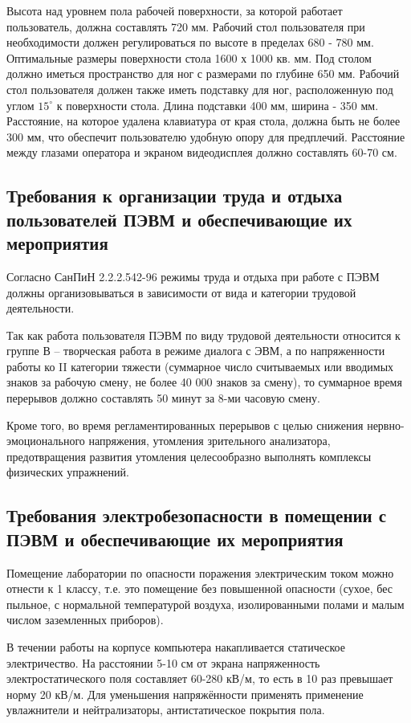 Высота над уровнем пола рабочей  поверхности, за которой работает пользователь, должна составлять 720 мм. Рабочий стол пользователя при необходимости должен регулироваться по высоте в пределах 680 - 780 мм. Оптимальные  размеры  поверхности  стола 1600 х 1000 кв. мм. Под столом должно иметься пространство для ног с размерами по глубине 650 мм. Рабочий стол пользователя должен также иметь подставку для ног, расположенную под углом $15^\circ$ к поверхности стола. Длина подставки 400 мм, ширина - 350 мм. Расстояние, на которое удалена клавиатура от края стола, должна быть не более 300 мм, что обеспечит пользователю удобную опору для предплечий. Расстояние между глазами оператора и экраном видеодисплея должно составлять 60-70 см.

\subsection{Требования к организации труда и отдыха пользователей ПЭВМ и обеспечивающие их мероприятия}
Согласно СанПиН 2.2.2.542-96 режимы труда и отдыха при работе с ПЭВМ должны организовываться в зависимости от вида и категории трудовой деятельности.

Так как работа пользователя ПЭВМ по виду трудовой деятельности относится к группе В – творческая работа в режиме диалога с ЭВМ, а по напряженности работы ко II категории тяжести (суммарное число считываемых или вводимых знаков за рабочую смену, не более 40 000 знаков за смену), то суммарное время перерывов должно составлять 50 минут за 8-ми часовую смену.

Кроме того, во время регламентированных перерывов с целью снижения нервно-эмоционального напряжения, утомления зрительного анализатора, предотвращения развития утомления целесообразно выполнять комплексы физических упражнений.

\subsection{Требования электробезопасности в помещении с ПЭВМ и обеспечивающие их мероприятия}
Помещение лаборатории по опасности поражения электрическим током можно отнести к 1 классу, т.е. это помещение без повышенной опасности (сухое,  бес пыльное,  с нормальной температурой воздуха, изолированными полами и малым числом заземленных приборов).

В течении работы на корпусе компьютера накапливается статическое электричество. На расстоянии 5-10 см от экрана напряженность электростатического поля составляет 60-280 кВ/м, то есть в 10 раз  превышает  норму  20 кВ/м. Для уменьшения напряжённости применять применение увлажнители и нейтрализаторы, антистатическое покрытия пола.

